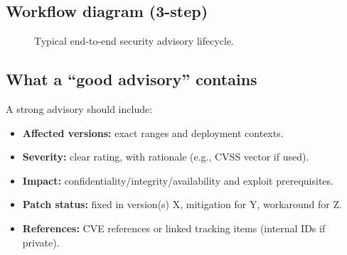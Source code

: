 \documentclass[11pt]{article}
\begin{document}
\subsection{Workflow diagram (3-step)}
\begin{figure}[h!]
\centering
{}
\caption{Typical end-to-end security advisory lifecycle.}
\end{figure}

\subsection{What a ``good advisory'' contains}
A strong advisory should include:

\begin{itemize}[leftmargin=*,itemsep=2pt]
  \item \textbf{Affected versions:} exact ranges and deployment contexts.
  \item \textbf{Severity:} clear rating, with rationale (e.g., CVSS vector if used).
  \item \textbf{Impact:} confidentiality/integrity/availability and exploit prerequisites.
  \item \textbf{Patch status:} fixed in version(s) X, mitigation for Y, workaround for Z.
  \item \textbf{References:} CVE references or linked tracking items (internal IDs if private).
\end{itemize}
\end{document}
